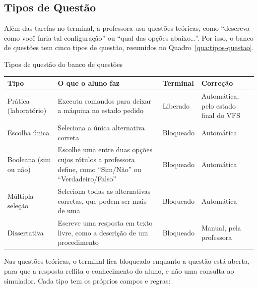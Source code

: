 \subsection{Tipos de Questão}
\label{sec:tipos-questao}

Além das tarefas no terminal, a professora usa questões teóricas, como ``descreva como você faria tal configuração'' ou ``qual das opções abaixo\ldots''. Por isso, o banco de questões tem cinco tipos de questão, resumidos no Quadro~\ref{qua:tipos-questao}.

\begin{quadro}[htbp]
    \caption{Tipos de questão do banco de questões}
    \label{qua:tipos-questao}
    \footnotesize
    \begin{tabularx}{\textwidth}{|>{\raggedright\arraybackslash}p{2.6cm}|L|>{\raggedright\arraybackslash}p{2.0cm}|>{\raggedright\arraybackslash}p{3.0cm}|}
        \hline
        \textbf{Tipo} & \textbf{O que o aluno faz} & \textbf{Terminal} & \textbf{Correção} \\
        \hline
        Prática (laboratório) & Executa comandos para deixar a máquina no estado pedido & Liberado & Automática, pelo estado final do VFS \\
        \hline
        Escolha única & Seleciona a única alternativa correta & Bloqueado & Automática \\
        \hline
        Booleana (sim ou não) & Escolhe uma entre duas opções cujos rótulos a professora define, como ``Sim/Não'' ou ``Verdadeiro/Falso'' & Bloqueado & Automática \\
        \hline
        Múltipla seleção & Seleciona todas as alternativas corretas, que podem ser mais de uma & Bloqueado & Automática \\
        \hline
        Dissertativa & Escreve uma resposta em texto livre, como a descrição de um procedimento & Bloqueado & Manual, pela professora \\
        \hline
    \end{tabularx}
\end{quadro}

Nas questões teóricas, o terminal fica bloqueado enquanto a questão está aberta, para que a resposta reflita o conhecimento do aluno, e não uma consulta ao simulador. Cada tipo tem os próprios campos e regras:

